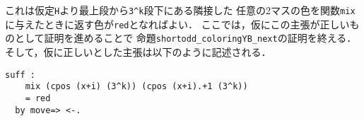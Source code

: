 これは仮定{\tt{H}}より最上段から{\tt{3\verb|^|k}}段下にある隣接した
任意の2マスの色を関数{\tt{mix}}に与えたときに返す色が{\tt{red}}となればよい．
ここでは，仮にこの主張が正しいものとして証明を進めることで
命題{\tt{shortodd\_coloringYB\_next}}の証明を終える．
そして，仮に正しいとした主張は以下のように記述される．
\begin{lstlisting}[language=Coq]
  suff :
    mix (cpos (x+i) (3^k)) (cpos (x+i).+1 (3^k))
    = red
  by move=> <-.
\end{lstlisting}
  


